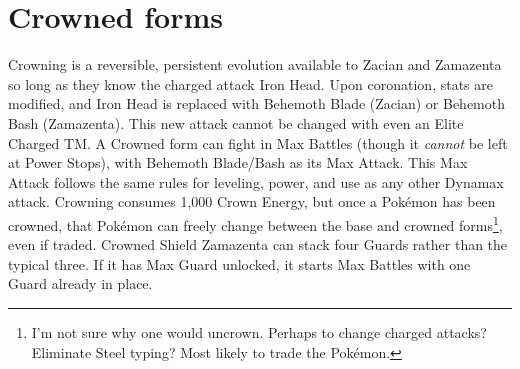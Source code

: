 \section{Crowned forms}
\label{sec:crowned}
Crowning is a reversible, persistent evolution available to Zacian and Zamazenta
 so long as they know the charged attack Iron Head.
Upon coronation, stats are modified, and Iron Head is replaced with Behemoth Blade (Zacian)
  or Behemoth Bash (Zamazenta).
This new attack cannot be changed with even an Elite Charged TM\@.
A Crowned form can fight in Max Battles (though it \textit{cannot} be left at Power Stops), with Behemoth Blade/Bash as its Max Attack.
This Max Attack follows the same rules for leveling, power, and use as any other Dynamax attack.
Crowning consumes 1,000 Crown Energy, but once a Pokémon has been crowned,
  that Pokémon can freely change between the base and crowned
  forms\footnote{I'm not sure why one would uncrown. Perhaps to change charged attacks?
    Eliminate Steel typing? Most likely to trade the Pokémon.}, even if traded.
Crowned Shield Zamazenta can stack four Guards rather than the typical three.
If it has Max Guard unlocked, it starts Max Battles with one Guard already in place.



